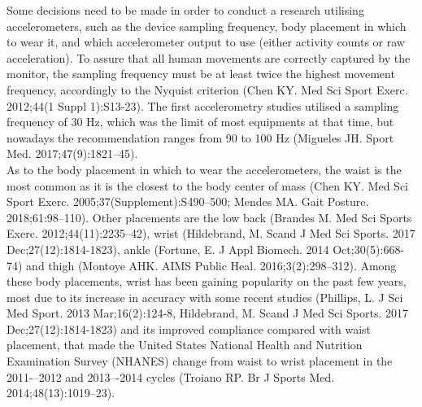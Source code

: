 \documentclass[11pt]{article}
\begin{document}
Some decisions need to be made in order to conduct a research utilising accelerometers, such as the device sampling frequency, body placement in which to wear it, and which accelerometer output to use (either activity counts or raw acceleration). To assure that all human movements are correctly captured by the monitor, the sampling frequency must be at least twice the highest movement frequency, accordingly to the Nyquist criterion {\tiny (Chen KY. Med Sci Sport Exerc. 2012;44(1 Suppl 1):S13-23)}. The first accelerometry studies utilised a sampling frequency of 30 Hz, which was the limit of most equipments at that time, but nowadays the recommendation ranges from 90 to 100 Hz {\tiny (Migueles JH. Sport Med. 2017;47(9):1821–45)}. \\

As to the body placement in which to wear the accelerometers, the waist is the most common as it is the closest to the body center of mass {\tiny (Chen KY. Med Sci Sport Exerc. 2005;37(Supplement):S490–500; Mendes MA. Gait Posture. 2018;61:98–110)}. Other placements are the low back {\tiny (Brandes M. Med Sci Sports Exerc. 2012;44(11):2235–42)}, wrist {\tiny (Hildebrand, M. Scand J Med Sci Sports. 2017 Dec;27(12):1814-1823)}, ankle {\tiny (Fortune, E. J Appl Biomech. 2014 Oct;30(5):668-74)} and thigh {\tiny (Montoye AHK. AIMS Public Heal. 2016;3(2):298–312)}. Among these body placements, wrist has been gaining popularity on the past few years, most due to its increase in accuracy with  some recent studies {\tiny (Phillips, L. J Sci Med Sport. 2013 Mar;16(2):124-8, Hildebrand, M. Scand J Med Sci Sports. 2017 Dec;27(12):1814-1823)} and its improved compliance compared with waist placement, that made the United States National Health and Nutrition Examination Survey (NHANES) change from waist to wrist placement in the 2011-–2012 and 2013–-2014 cycles {\tiny (Troiano RP. Br J Sports Med. 2014;48(13):1019–23)}.
\end{document}
